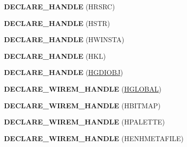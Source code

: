 \begin{DoxyCompactItemize}
\item 
\mbox{\label{interface_i_win_types_ac0266db209ae1539ac20aa94fe627d6a}} 
{\bfseries D\+E\+C\+L\+A\+R\+E\+\_\+\+H\+A\+N\+D\+LE} (H\+R\+S\+RC)
\item 
\mbox{\label{interface_i_win_types_a2d040f9e5a249a10bfd9f556bccd8fdc}} 
{\bfseries D\+E\+C\+L\+A\+R\+E\+\_\+\+H\+A\+N\+D\+LE} (H\+S\+TR)
\item 
\mbox{\label{interface_i_win_types_a92076800dd67a1f1712b602d6c85ab79}} 
{\bfseries D\+E\+C\+L\+A\+R\+E\+\_\+\+H\+A\+N\+D\+LE} (H\+W\+I\+N\+S\+TA)
\item 
\mbox{\label{interface_i_win_types_a13aa5e5339e635e57c7426489aaa1de4}} 
{\bfseries D\+E\+C\+L\+A\+R\+E\+\_\+\+H\+A\+N\+D\+LE} (H\+KL)
\item 
\mbox{\label{interface_i_win_types_ae80299a47e00339f2fd20938fd83f3e6}} 
{\bfseries D\+E\+C\+L\+A\+R\+E\+\_\+\+H\+A\+N\+D\+LE} (\hyperlink{interfacevoid}{H\+G\+D\+I\+O\+BJ})
\item 
\mbox{\label{interface_i_win_types_a22c1d31fa9b7e1fd47790a98179f5c4e}} 
{\bfseries D\+E\+C\+L\+A\+R\+E\+\_\+\+W\+I\+R\+E\+M\+\_\+\+H\+A\+N\+D\+LE} (\hyperlink{interfacevoid}{H\+G\+L\+O\+B\+AL})
\item 
\mbox{\label{interface_i_win_types_a0df96272140151fc9c60b2b65779258d}} 
{\bfseries D\+E\+C\+L\+A\+R\+E\+\_\+\+W\+I\+R\+E\+M\+\_\+\+H\+A\+N\+D\+LE} (H\+B\+I\+T\+M\+AP)
\item 
\mbox{\label{interface_i_win_types_a2fc56370da13b47d0161fd9c5dffda1c}} 
{\bfseries D\+E\+C\+L\+A\+R\+E\+\_\+\+W\+I\+R\+E\+M\+\_\+\+H\+A\+N\+D\+LE} (H\+P\+A\+L\+E\+T\+TE)
\item 
\mbox{\label{interface_i_win_types_a34019e966b7090b87343916b8f713550}} 
{\bfseries D\+E\+C\+L\+A\+R\+E\+\_\+\+W\+I\+R\+E\+M\+\_\+\+H\+A\+N\+D\+LE} (H\+E\+N\+H\+M\+E\+T\+A\+F\+I\+LE)
\item 
\mbox{\label{interface_i_win_types_a452668a64f13faab3776f962f2b98737}} 

\end{DoxyCompactItemize}
